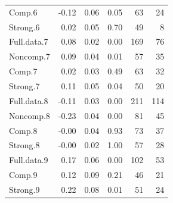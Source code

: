 \begin{table}[ht]
\begin{tabular}{lrrrrr}
  Comp.6 & -0.12 & 0.06 & 0.05 & 63 & 24 \\ 
  Strong.6 & 0.02 & 0.05 & 0.70 & 49 & 8 \\ 
  Full.data.7 & 0.08 & 0.02 & 0.00 & 169 & 76 \\ 
  Noncomp.7 & 0.09 & 0.04 & 0.01 & 57 & 35 \\ 
  Comp.7 & 0.02 & 0.03 & 0.49 & 63 & 32 \\ 
  Strong.7 & 0.11 & 0.05 & 0.04 & 50 & 20 \\ 
  Full.data.8 & -0.11 & 0.03 & 0.00 & 211 & 114 \\ 
  Noncomp.8 & -0.23 & 0.04 & 0.00 & 81 & 45 \\ 
  Comp.8 & -0.00 & 0.04 & 0.93 & 73 & 37 \\ 
  Strong.8 & -0.00 & 0.02 & 1.00 & 57 & 28 \\ 
  Full.data.9 & 0.17 & 0.06 & 0.00 & 102 & 53 \\ 
  Comp.9 & 0.12 & 0.09 & 0.21 & 46 & 21 \\ 
  Strong.9 & 0.22 & 0.08 & 0.01 & 51 & 24 \\ 
   \hline
\end{tabular}
\end{table}
